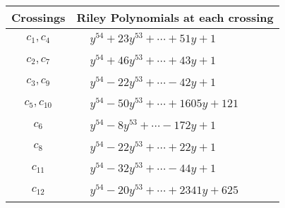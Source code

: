 \documentclass[1p]{elsarticle_modified}
\theoremstyle{definition}
\begin{document}
\begin{tabular}{m{50pt}|m{274pt}}
Crossings & \hspace{64pt}Riley Polynomials at each crossing \\
\hline $$\begin{aligned}c_{1},c_{4}\end{aligned}$$&$\begin{aligned}
&y^{54}+23 y^{53}+\cdots+51 y+1
\end{aligned}$\\
\hline $$\begin{aligned}c_{2},c_{7}\end{aligned}$$&$\begin{aligned}
&y^{54}+46 y^{53}+\cdots+43 y+1
\end{aligned}$\\
\hline $$\begin{aligned}c_{3},c_{9}\end{aligned}$$&$\begin{aligned}
&y^{54}-22 y^{53}+\cdots-42 y+1
\end{aligned}$\\
\hline $$\begin{aligned}c_{5},c_{10}\end{aligned}$$&$\begin{aligned}
&y^{54}-50 y^{53}+\cdots+1605 y+121
\end{aligned}$\\
\hline $$\begin{aligned}c_{6}\end{aligned}$$&$\begin{aligned}
&y^{54}-8 y^{53}+\cdots-172 y+1
\end{aligned}$\\
\hline $$\begin{aligned}c_{8}\end{aligned}$$&$\begin{aligned}
&y^{54}-22 y^{53}+\cdots+22 y+1
\end{aligned}$\\
\hline $$\begin{aligned}c_{11}\end{aligned}$$&$\begin{aligned}
&y^{54}-32 y^{53}+\cdots-44 y+1
\end{aligned}$\\
\hline $$\begin{aligned}c_{12}\end{aligned}$$&$\begin{aligned}
&y^{54}-20 y^{53}+\cdots+2341 y+625
\end{aligned}$\\
\hline
\end{tabular}\\~\\
\end{document}
